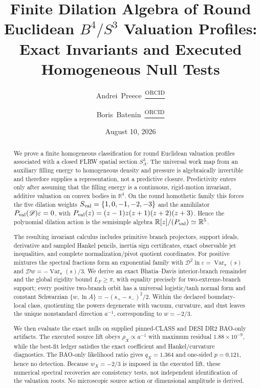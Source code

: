 \documentclass[aps,prd,reprint,onecolumn,nofootinbib,superscriptaddress,showkeys]{revtex4-2}
\providecommand{\orcidlink}[1]{%
  \href{https://orcid.org/#1}{\textsuperscript{\scriptsize ORCID}}%
}
\numberwithin{equation}{section}
\theoremstyle{definition}
\theoremstyle{plain}
\begin{document}
\title{Finite Dilation Algebra of Round Euclidean \texorpdfstring{$B^4/S^3$}{B4/S3} Valuation Profiles: Exact Invariants and Executed Homogeneous Null Tests}

\author{Andrei~Preece\,\orcidlink{0009-0004-5978-795X}}

\author{Boris~Batenin\,\orcidlink{0009-0000-7027-8583}}

\date{August 10, 2026}

\begin{abstract}
We prove a finite homogeneous classification for round Euclidean valuation profiles associated with a closed FLRW spatial section \(S^3_A\).  The universal work map from an auxiliary filling energy to homogeneous density and pressure is algebraically invertible and therefore supplies a representation, not a predictive closure.  Predictivity enters only after assuming that the filling energy is a continuous, rigid-motion invariant, additive valuation on convex bodies in \(\mathbb R^4\).  On the round homothetic family this forces the five dilation weights \(S_{\rm val}=\{1,0,-1,-2,-3\}\) and the annihilator \(P_{\rm val}(\mathscr D)\varepsilon=0\), with \(P_{\rm val}(z)=(z-1)z(z+1)(z+2)(z+3)\).  Hence the polynomial dilation action is the semisimple algebra \(\mathbb R[z]/(P_{\rm val})\simeq\mathbb R^5\).

The resulting invariant calculus includes primitive branch projectors, support ideals, derivative and sampled Hankel pencils, inertia sign certificates, exact observable jet inequalities, and complete normalization/pivot quotient coordinates.  For positive mixtures the spectral fractions form an exponential family with \(\mathscr D^2\ln\varepsilon=\operatorname{Var}_\pi(s)\) and \(\mathscr D w=-\operatorname{Var}_\pi(s)/3\).  We derive an exact Bhatia--Davis interior-branch remainder and the global rigidity bound \(L_F\ge\pi\), with equality precisely for two-extreme-branch support; every positive two-branch orbit has a universal logistic/tanh normal form and constant Schwarzian \(\{w,\ln A\}=-(s_+-s_-)^2/2\).  Within the declared boundary-local class, quotienting the powers degenerate with vacuum, curvature, and dust leaves the unique nonstandard direction \(a^{-1}\), corresponding to \(w=-2/3\).

We then evaluate the exact nulls on supplied pinned-CLASS and DESI DR2 BAO-only artifacts.  The executed source lift obeys \(\rho_X\propto a^{-1}\) with maximum residual \(1.88\times10^{-9}\), while the best-fit ledger satisfies the exact coefficient and Hankel/curvature diagnostics.  The BAO-only likelihood ratio gives \(q_X=1.364\) and one-sided \(p=0.121\), hence no detection.  Because \(w_X=-2/3\) is imposed in the executed lift, these numerical spectral recoveries are consistency tests, not independent identification of the valuation roots.  No microscopic source action or dimensional amplitude is derived.
\end{abstract}
\end{document}
